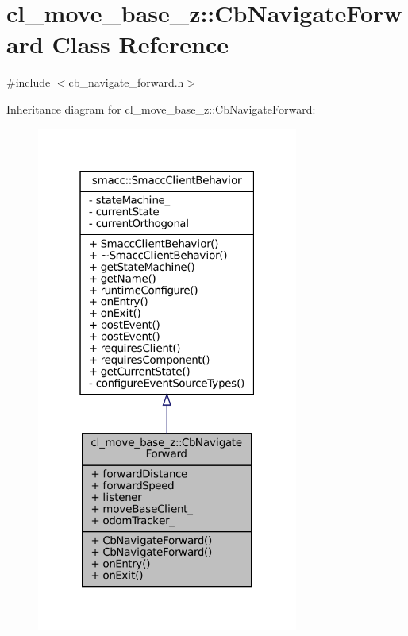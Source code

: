 \hypertarget{classcl__move__base__z_1_1CbNavigateForward}{}\section{cl\+\_\+move\+\_\+base\+\_\+z\+:\+:Cb\+Navigate\+Forward Class Reference}
\label{classcl__move__base__z_1_1CbNavigateForward}


{\ttfamily \#include $<$cb\+\_\+navigate\+\_\+forward.\+h$>$}



Inheritance diagram for cl\+\_\+move\+\_\+base\+\_\+z\+:\+:Cb\+Navigate\+Forward\+:
\nopagebreak
\begin{figure}[H]
\begin{center}
\leavevmode
\includegraphics[width=244pt]{classcl__move__base__z_1_1CbNavigateForward__inherit__graph}
\end{center}
\end{figure}


